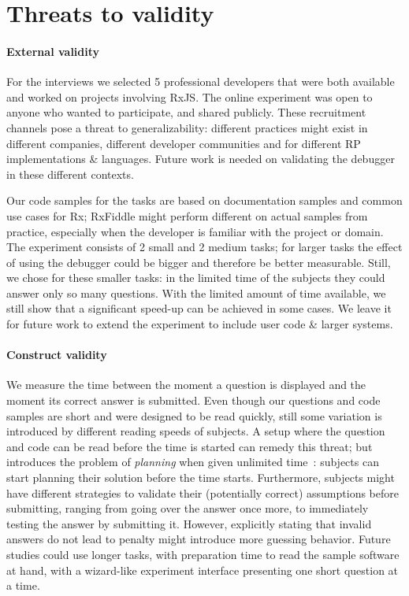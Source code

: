 \section{Threats to validity}
\paragraph{External validity}
For the interviews we selected 5 professional developers that were both available and worked on projects involving RxJS. 
The online experiment was open to anyone who wanted to participate, and shared publicly. These recruitment channels pose a threat to generalizability: different practices might exist in different companies, different developer communities and for different RP implementations \& languages. Future work is needed on validating the debugger in these different contexts.

Our code samples for the tasks are based on documentation samples and common use cases for Rx; RxFiddle might perform different on actual samples from practice, especially when the developer is familiar with the project or domain. The experiment consists of 2 small and 2 medium tasks; for larger tasks the effect of using the debugger could be bigger and therefore be better measurable. Still, we chose for these smaller tasks: in the limited time of the subjects they could answer only so many questions. With the limited amount of time available, we still show that a significant speed-up can be achieved in some cases. We leave it for future work to extend the experiment to include user code \& larger systems.

\paragraph{Construct validity}
We measure the time between the moment a question is displayed and the moment its correct answer is submitted. Even though our questions and code samples are short and were designed to be read quickly, still some variation is introduced by different reading speeds of subjects. 
A setup where the question and code can be read before the time is started can remedy this threat; but introduces the problem of \emph{planning} when given unlimited time~\cite{ko2015practical}: subjects can start planning their solution before the time starts.
Furthermore, subjects might have different strategies to validate their (potentially correct) assumptions before submitting, ranging from going over the answer once more, to immediately testing the answer by submitting it. However, explicitly stating that invalid answers do not lead to penalty might introduce more guessing behavior. Future studies could use longer tasks, with preparation time to read the sample software at hand, with a wizard-like experiment interface presenting one short question at a time.  

